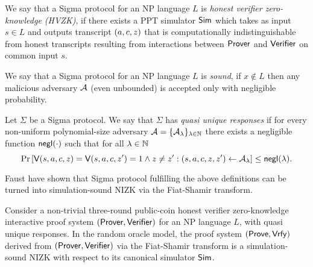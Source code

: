 \begin{definition}
We say that a Sigma protocol for an NP language  $L$ is \emph{honest verifier zero-knowledge (HVZK)}, if there exists a PPT simulator $\mathsf{Sim}$ which takes as input $s \in L$ and outputs transcript $(a,c,z)$ that is computationally indistinguishable from honest
transcripts resulting from interactions between $\mathsf{Prover}$ and $\mathsf{Verifier}$ on common input $s$.
\end{definition}

\begin{definition}[Soundness]
We say that a Sigma protocol for an NP language $L$ is \emph{sound}, if $x \notin L$ then any malicious adversary $\mathcal{A}$ (even unbounded) is accepted only with negligible probability.
\end{definition}

\begin{definition}
Let $\Sigma$ be a Sigma protocol. We say that $\Sigma$ has \emph{quasi unique responses} if for every non-uniform polynomial-size adversary $\mathcal{A} = \{\mathcal{A}_{\lambda}\}_{\lambda \in \mathbb{N}}$ there exists a negligible function $\mathsf{negl}(\cdot)$ such that for all $\lambda \in \mathbb{N}$ 
\[\Pr\left[ \mathsf{V}(s,a,c,z) = \mathsf{V}(s,a,c,z' ) = 1 \land z \neq z' : (s, a, c , z, z')\leftarrow \mathcal{A}_{\lambda} \right] \leq \mathsf{negl}(\lambda).\]
\end{definition}

Faust \etal \cite{INDOCRYPT:FKMV12} have shown that Sigma protocol fulfilling the above definitions can be turned into simulation-sound NIZK via the Fiat-Shamir transform. 

\begin{theorem}\label{thm:fs}
Consider a non-trivial three-round public-coin honest verifier zero-knowledge interactive proof system $(\mathsf{Prover}, \mathsf{Verifier})$ for an NP language $L$, with quasi unique responses. In the random oracle model, the proof system $(\mathsf{Prove}, \mathsf{Vrfy})$ derived from $(\mathsf{Prover}, \mathsf{Verifier})$ via the Fiat-Shamir transform is a simulation-sound NIZK with respect to its canonical simulator $\mathsf{Sim}$.
\end{theorem}

